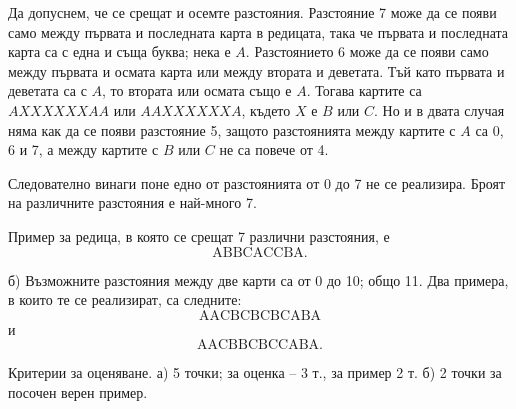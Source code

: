 Да допуснем, че се срещат и осемте разстояния. Разстояние 7 може да се появи само между първата и последната карта в редицата, така че първата и последната карта са с една и съща буква; нека е $A$. Разстоянието 6 може да се появи само между първата и осмата карта или между втората и деветата. Тъй като първата и деветата са с $A$, то втората или осмата също е $A$. Тогава картите са $AXXXXXXAA$ или $AAXXXXXXA$, където $X$ е $B$ или $C$. Но и в двата случая няма как да се появи разстояние 5, защото разстоянията между картите с $A$ са 0, 6 и 7, а между картите с $B$ или $C$ не са повече от 4.

Следователно винаги поне едно от разстоянията от 0 до 7 не се реализира. Броят на различните разстояния е най-много 7.

Пример за редица, в която се срещат 7 различни разстояния, е
$$
\boxed{\mathrm A}\boxed{\mathrm B}\boxed{\mathrm B}\boxed{\mathrm C}\boxed{\mathrm A}\boxed{\mathrm C}\boxed{\mathrm C}\boxed{\mathrm B}\boxed{\mathrm A}.
$$

б) Възможните разстояния между две карти са от 0 до 10; общо 11. Два примера, в които те се реализират, са следните:
$$
\boxed{\mathrm A}\boxed{\mathrm A}\boxed{\mathrm C}\boxed{\mathrm B}\boxed{\mathrm C}\boxed{\mathrm B}\boxed{\mathrm C}\boxed{\mathrm B}\boxed{\mathrm C}\boxed{\mathrm A}\boxed{\mathrm B}\boxed{\mathrm A}
$$
и
$$
\boxed{\mathrm A}\boxed{\mathrm A}\boxed{\mathrm C}\boxed{\mathrm B}\boxed{\mathrm B}\boxed{\mathrm C}\boxed{\mathrm B}\boxed{\mathrm C}\boxed{\mathrm C}\boxed{\mathrm A}\boxed{\mathrm B}\boxed{\mathrm A}.
$$

Критерии за оценяване. а) 5 точки; за оценка – 3 т., за пример 2 т. б) 2 точки за посочен верен пример.
